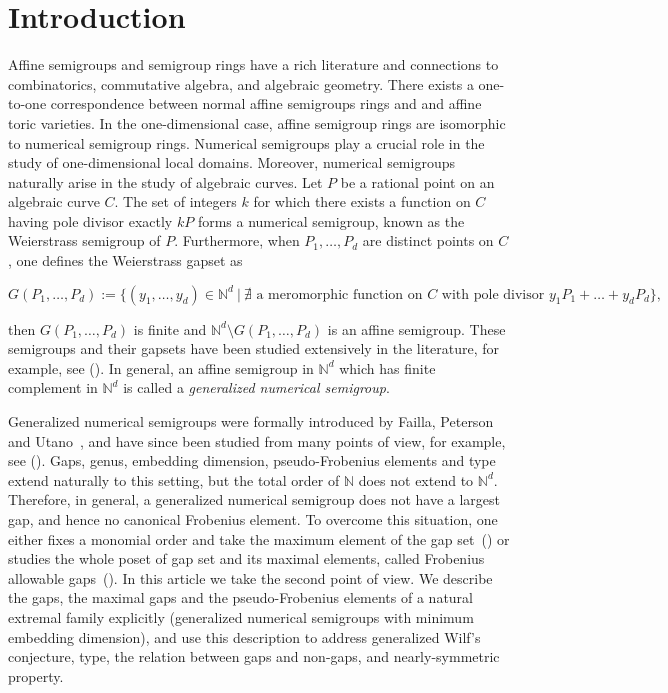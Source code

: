 \documentclass[12pt]{amsart}
\theoremstyle{plain}
\theoremstyle{theorem}
\theoremstyle{remark}
\begin{document}
		
		\maketitle
		
\section{Introduction}
Affine semigroups and semigroup rings have a rich literature and connections to combinatorics, commutative algebra, and algebraic geometry. There exists a one-to-one correspondence between normal affine semigroups rings and and affine toric varieties. In the one-dimensional case, affine semigroup rings are isomorphic to numerical semigroup rings. Numerical semigroups play a crucial role in the study of one-dimensional local domains. Moreover, numerical semigroups naturally arise in the study of algebraic curves. Let $P$ be a rational point on an algebraic curve $C$. 
The set of integers $k$ for which there exists a function on $C$ having pole divisor exactly $kP$ forms a numerical semigroup, known as the Weierstrass semigroup of $P$.  
Furthermore, when $P_1, \ldots, P_d$ are distinct points on $C$, 
one defines the Weierstrass gapset as

{\Small
	\[
	G(P_1, \ldots, P_d) := 
	\big\{ (y_1, \ldots, y_d) \in \mathbb{N}^d 
	\ \big|\ 
	\nexists \text{ a meromorphic function on } C 
	\text{ with pole divisor } y_1 P_1 + \dots + y_d P_d \big\},\]}
    
    then $G(P_1, \ldots, P_d)$ is finite and $\mathbb{N}^d \setminus 	G(P_1, \ldots, P_d)$ is an affine semigroup. These semigroups and their gapsets have been studied extensively in the literature, for example, see (\cite{Ballico-Kim98,Beelen2006,Carvalho-et-al2005,Ishii2002,Matthews2001}). In general, an affine semigroup in $\mathbb{N}^d$ which has finite complement in $\mathbb{N}^d$ is called a \textit{generalized numerical semigroup}.

Generalized numerical semigroups were formally introduced by Failla, Peterson and Utano~\cite{Failla-et-al2016}, and have since been studied from many points of view, for example, see (\cite{Bernardini-et-al2024,Bhardwaj-Goel-Sengupta2023, Cisto-Tapia-Ramos2026,Failla-et-al2016, Garcia-et-al2024, Li2025,HemaSrinivasan2025,Singhal-Lin2022}).  Gaps, genus, embedding dimension, pseudo-Frobenius elements and type extend naturally to this setting, but the total order of $\mathbb{N}$ does not extend to $\mathbb{N}^d$. Therefore, in general, a generalized numerical semigroup does not have a largest gap, and hence no canonical Frobenius element. To overcome this situation, one either fixes a monomial order and take the maximum element of the gap set~(\cite{garcia2018extension, garcia-pseudofrobenius}) or studies the whole
poset of gap set and its maximal elements, called Frobenius allowable gaps~(\cite{Singhal-Lin2022}).  In this article we take the second point of view. We describe the gaps, the maximal
gaps and the pseudo-Frobenius elements of a natural extremal family explicitly (generalized numerical semigroups with minimum embedding dimension),
and use this description to address generalized Wilf’s conjecture, type, the relation between gaps and non-gaps, and nearly-symmetric property.
\end{document}
